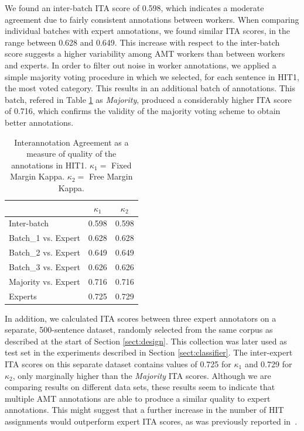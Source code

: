 \documentclass[11pt, a4paper,onecolumn]{article}
\begin{document}
We found an inter-batch ITA score of 0.598, which indicates a moderate agreement due to fairly consistent annotations between workers. When comparing individual batches with expert annotations, we found similar ITA scores, in the range between 0.628 and 0.649. This increase with respect to the inter-batch score suggests a higher variability among AMT workers than between workers and experts. 
In order to filter out noise in worker annotations, we applied a simple majority voting procedure in which we selected, for each sentence in HIT1, the most voted category. This results in an additional batch of annotations. This batch, refered in Table \ref{tablita} as \textit{Majority}, produced a considerably higher ITA score of 0.716, which confirms the validity of the majority voting scheme to obtain better annotations.

\begin{table}[h]
\begin{center}
\begin{tabular}{|l|c|c|}
\hline
& $\kappa_{1}$ & $\kappa_{2}$ \\ 
\hline
Inter-batch & 0.598 & 0.598 \\ \hline
Batch\_1 vs. Expert & 0.628 & 0.628\\
Batch\_2 vs. Expert & 0.649 & 0.649\\
Batch\_3 vs. Expert & 0.626 & 0.626\\ \hline
Majority vs. Expert & 0.716 & 0.716\\ \hline
Experts& 0.725 & 0.729\\ \hline
\end{tabular}
\end{center}
\caption{Interannotation Agreement as a measure of quality of the annotations in HIT1. $\kappa_{1} = $ Fixed Margin Kappa. $\kappa_{2} = $ Free Margin Kappa.}
\label{tablita}
\end{table}


In addition, we calculated ITA scores between three expert annotators on a separate, 500-sentence dataset, randomly selected from the same corpus as described at the start of Section \ref{sect:design}. This collection was later used as test set in the experiments described in Section \ref{sect:classifier}. The inter-expert ITA scores on this separate dataset contains values of 0.725 for $\kappa_{1}$ and 0.729 for $\kappa_{2}$, only marginally higher than the \textit{Majority} ITA scores. Although we are comparing results on different data sets, these results seem to indicate that multiple AMT annotations are able to produce a similar quality to expert annotations. This might suggest that a further increase in the number of HIT assignments would outperform expert ITA scores, as was previously reported in~\cite{snow_cheap_2008}.
\end{document}
